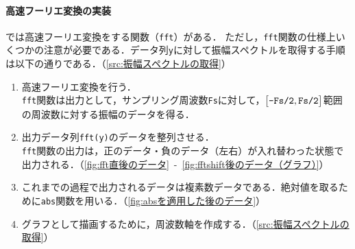 \paragraph{高速フーリエ変換の実装}
\matlab では高速フーリエ変換をする関数（\texttt{fft}）がある．
ただし，\texttt{fft}関数の仕様上いくつかの注意が必要である．データ列\texttt{y}に対して振幅スペクトルを取得する手順は以下の通りである．（\ref{src:振幅スペクトルの取得}）
\begin{enumerate}
    \item 高速フーリエ変換を行う．\\
          \texttt{fft}関数は出力として，サンプリング周波数\texttt{Fs}に対して，\(\big[\textrm{\texttt{-Fs/2}},\textrm{\texttt{Fs/2}}\big]\)範囲の周波数に対する振幅のデータを得る．
    \item 出力データ列\texttt{fft(y)}のデータを整列させる．\\
          \texttt{fft}関数の出力は，正のデータ・負のデータ（左右）が入れ替わった状態で出力される．（\ref{fig:fft直後のデータ}\ -\ \ref{fig:fftshift後のデータ（グラフ）}）
    \item これまでの過程で出力されるデータは複素数データである．絶対値を取るために\texttt{abs}関数を用いる．（\ref{fig:absを適用した後のデータ}）
    \item グラフとして描画するために，周波数軸を作成する．（\ref{src:振幅スペクトルの取得}）
\end{enumerate}
